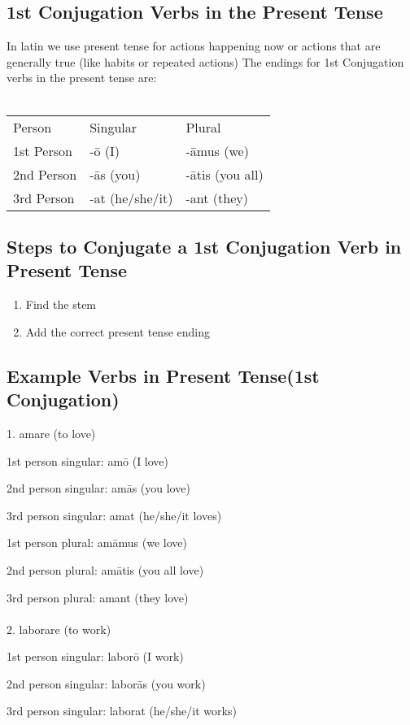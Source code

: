\subsection*{1st Conjugation Verbs in the Present Tense}
In latin we use present tense for actions happening now or 
actions that are generally true (like habits or repeated actions) \newline
The endings for 1st Conjugation verbs in the present tense are: \\ \\
\begin{tabular}{lll}
  Person & Singular & Plural \\
  1st Person & -ō (I) & -āmus (we) \\ 
  2nd Person & -ās (you) & -ātis (you all) \\ 
  3rd Person & -at (he/she/it) & -ant (they) \\
\end{tabular}
\subsection*{Steps to Conjugate a 1st Conjugation Verb in Present Tense}
\begin{enumerate}
  \item Find the stem 
  \item Add the correct present tense ending
\end{enumerate}
\subsection*{Example Verbs in Present Tense(1st Conjugation)}
1. amare (to love)

    1st person singular: amō (I love)

    2nd person singular: amās (you love)

    3rd person singular: amat (he/she/it loves)

    1st person plural: amāmus (we love)

    2nd person plural: amātis (you all love)

    3rd person plural: amant (they love) \\ \\
2. laborare (to work)

    1st person singular: laborō (I work)

    2nd person singular: laborās (you work)

    3rd person singular: laborat (he/she/it works)

